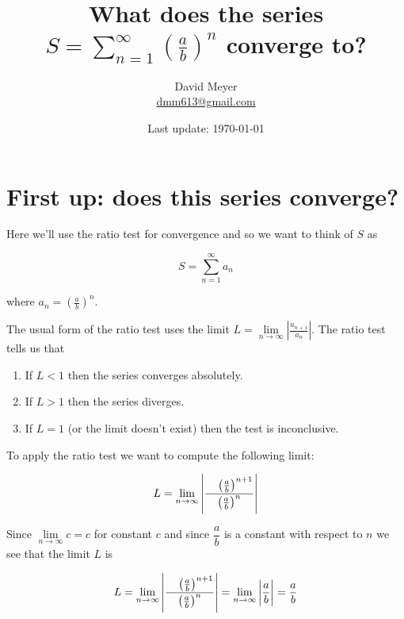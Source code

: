 \documentclass{article}
\title{What does the series $S = \sum\limits_{n = 1}^\infty {\left (\frac{a}{b} \right )}^{n}$ 
       converge to?}
\author{David Meyer \\ \href{mailto:dmm613@gmail.com}
                            {dmm613@gmail.com}}
\date{Last update: \today}
\theoremstyle{definition}
\begin{document}
\maketitle
%
%
%
\bigskip
\section{First up: does this series converge?}
Here we'll use the ratio test for convergence \cite{wiki:ratio_test}
and so we want to think of $S$ as

\bigskip
\begin{equation}
S = \sum\limits_{n = 1}^{\infty} a_n
\label{eqn:S}
\end{equation}

\medskip
\noindent
where $a_n = {\left ( \frac{a}{b} \right )}^n.$

\bigskip
\noindent
The usual form of the ratio test uses the limit 
$L = \lim\limits_{n\to \infty}\left|{\frac {a_{{n+1}}}{a_{n}}}\right|$.
The ratio test tells us that 

\medskip
\begin{enumerate}
\item If $L < 1$ then the series converges absolutely.
\label{enumerate:less_than_one}
\item If $L > 1$ then the series diverges.
\item If $L = 1$ (or the limit doesn't exist) then the test is 
      inconclusive.
\end{enumerate}

\bigskip
\noindent
To apply the ratio test we want to compute the following
limit:

\bigskip
\begin{equation*}
L = \lim _{n\to \infty}\left| \dfrac{\hphantom{^15}						%
								 \left ( \frac{a}{b}\right )^{n+1}} 
                                {\left ( \frac{a}{b} \right )^{n}} \right|
\end{equation*}

\bigskip
\noindent
Since $\lim\limits_{n\to \infty} c = c$ for constant $c$ and since 
$\dfrac{a}{b}$ is a constant with respect to $n$ we see that the limit 
$L$ is

\bigskip
\begin{equation*}
L = \lim _{n\to \infty}\left| \dfrac{\hphantom{^15}						%
								\left ( \frac{a}{b}\right )^{n+1}} 
                                {\left ( \frac{a}{b} \right )^{n}} \right|
                                = \lim _{n\to \infty}\left| \dfrac{a}{b} \right |
                                = \dfrac{a}{b}
\end{equation*}
\end{document}
